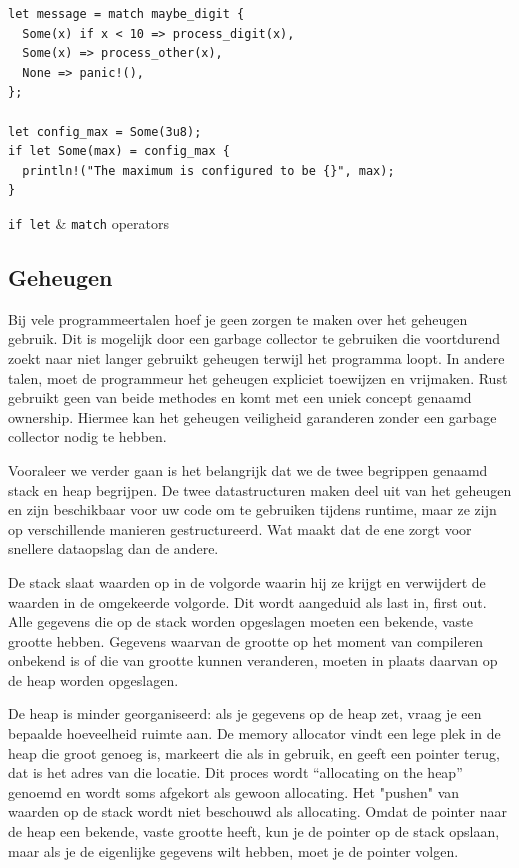 \begin{listing}[h]
\begin{verbatim}
let message = match maybe_digit {
  Some(x) if x < 10 => process_digit(x),
  Some(x) => process_other(x),
  None => panic!(),
};

let config_max = Some(3u8);
if let Some(max) = config_max {
  println!("The maximum is configured to be {}", max);
}
\end{verbatim}
\caption{\texttt{if let} \& \texttt{match} operators}
\end{listing}

\clearpage

\subsection{Geheugen}

Bij vele programmeertalen hoef je geen zorgen te maken over het geheugen gebruik. Dit is mogelijk
door een garbage collector te gebruiken die voortdurend zoekt naar niet langer gebruikt geheugen
terwijl het programma loopt. In andere talen, moet de programmeur het geheugen expliciet toewijzen
en vrijmaken. Rust gebruikt geen van beide methodes en komt met een uniek concept genaamd ownership.
Hiermee kan het geheugen veiligheid garanderen zonder een garbage collector nodig te hebben. 

Vooraleer we verder gaan is het belangrijk dat we de twee begrippen genaamd stack en heap begrijpen.
De twee datastructuren maken deel uit van het geheugen en zijn beschikbaar voor uw code om te
gebruiken tijdens runtime, maar ze zijn op verschillende manieren gestructureerd. Wat maakt dat de
ene zorgt voor snellere dataopslag dan de andere. 

De stack slaat waarden op in de volgorde waarin hij ze krijgt en verwijdert de waarden in de
omgekeerde volgorde. Dit wordt aangeduid als last in, first out. Alle gegevens die op de stack
worden opgeslagen moeten een bekende, vaste grootte hebben. Gegevens waarvan de grootte op het
moment van compileren onbekend is of die van grootte kunnen veranderen, moeten in plaats daarvan op
de heap worden opgeslagen. 

De heap is minder georganiseerd: als je gegevens op de heap zet, vraag je een bepaalde hoeveelheid
ruimte aan. De memory allocator vindt een lege plek in de heap die groot genoeg is, markeert die als
in gebruik, en geeft een pointer terug, dat is het adres van die locatie. Dit proces wordt
“allocating on the heap” genoemd en wordt soms afgekort als gewoon allocating. Het "pushen" van
waarden op de stack wordt niet beschouwd als allocating. Omdat de pointer naar de heap een bekende,
vaste grootte heeft, kun je de pointer op de stack opslaan, maar als je de eigenlijke gegevens wilt
hebben, moet je de pointer volgen. 

